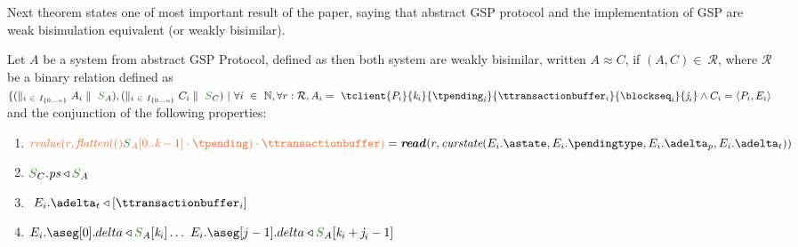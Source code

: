 \documentclass[envcountsect,runningheads,orivec]{llncs}
\begin{document}
Next theorem states one of most important result of the paper, saying that abstract GSP protocol and the implementation of GSP are weak bisimulation equivalent (or weakly bisimilar). 

\begin{theorem}
Let $A$ be a system from abstract GSP Protocol, defined as  then both system are weakly bisimilar, written $A \approx C$, if $(A,C)  \in \ \mathcal{R}$, where $\mathcal{R}$ be a binary relation defined as $\{ (\parallel_{i \ \in\ I_{\{0 \ldots n\}}} A_i \parallel \ \queuemessage_A),(\parallel_{i \ \in\ I_{\{0 \ldots n\}}} C_i \parallel \ \queuemessage_C) \ | \ \forall i \ \in\ \mathbb{N}, \forall r: \readtype, A_i = \ \tclient{\tprogram_i}{\tknown_i}{\tpending_i}{\ttransactionbuffer_i}{\tsent_i}{\treceivebuffer_i} \land C_i = \client{P_i}{\stateclient_i}$ and the conjunction of the following properties: %
{}
\begin{enumerate}
	\item $\rvalue{r}{\flatten(\queuemessage_{A}[0..\tknown-1] \cdot \tpending) \cdot \ttransactionbuffer} = \readp{r}{\curstate{E_{i}.\known}{E_{i}.\pending}{E_{i}.\pushbuffer}{E_{i}.\transactionbuffer}}$
	\item $\queuemessage_C.\state \triangleleft \queuemessage_A$
	\item $\ E_{i}.\transactionbuffer \triangleleft [\ttransactionbuffer_i]$
	\item $E_{i}.\receivebuffer[0].delta \triangleleft \queuemessage_A[\tknown_i] \ldots\ E_{i}.\receivebuffer[j - 1].delta \triangleleft \queuemessage_A[\tknown_i + \treceivebuffer_i - 1]$

\end{enumerate}
\end{theorem}
\end{document}
